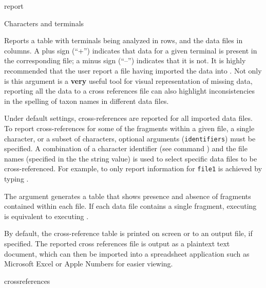 \begin{command}{report}{}
\begin{arguments}
\begin{argumentgroup}{Characters and terminals}

{Reports a table with terminals being analyzed in rows, and the
data files in columns. A plus sign (``+'') indicates that data for a given
terminal is present in the corresponding file; a minus sign (``--'') indicates that it is
not. It is highly recommended that the user report a 
file having imported the data into \poy. Not only is this argument is a {\bf very} 
useful tool for visual representation of missing data, reporting all the data to a 
cross references file can also highlight inconsistencies in the spelling 
of taxon names in different data files.

\setlength{\parindent}{0.5cm}                
\indent 
Under default settings, cross-references are reported for
all imported data files. To report cross-references for some of
the fragments within a given file, a single character, or a subset
of characters, optional arguments (\texttt{identifiers}) must be specified. A combination of
a character identifier (see command ) and
the file names (specified in the the string value) is used to select specific
data files to be cross-referenced. For example, to only report information 
for \texttt{file1} is achieved by typing .

\setlength{\parindent}{0.5cm}                
\indent 
The argument  generates
a table that shows presence and absence of fragments contained
within each file. If each data file contains a
single fragment, executing 
is equivalent to executing .

By default, the cross-reference table is printed on screen or to an
output file, if specified. The reported cross references file is output 
as a plaintext text document, which can then be imported into a 
spreadsheet application such as Microsoft Excel or Apple Numbers 
for easier viewing.}
{crossreferences}


\end{argumentgroup}
\end{arguments}
\end{command}
